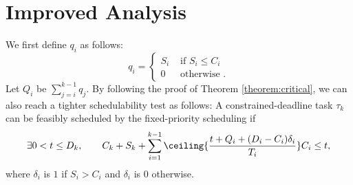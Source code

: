 \section{Improved Analysis}

We first define $q_i$ as follows:
\begin{equation}
  \label{eq:qi}
  q_i =
  \begin{cases}
    S_i & \mbox{ if } S_i \leq C_i\\
    0 & \mbox{ otherwise }.
  \end{cases}
\end{equation}
Let $Q_i$ be $\sum_{j=i}^{k-1} q_j$.  
By following the proof of Theorem \ref{theorem:critical}, we can also reach a tighter schedulability test as follows: A constrained-deadline task $\tau_k$ can be feasibly scheduled by the fixed-priority scheduling if
\begin{equation} \label{eq:TDA-suspension-tighter} 
\exists 0 < t \leq D_k, \qquad C_k+S_k+ \sum_{i=1}^{k-1}\ceiling{\frac{t+Q_i+(D_i-C_i)\delta_i}{T_i}} C_i \leq t,
\end{equation}
where $\delta_i$ is $1$ if $S_i > C_i$ and $\delta_i$ is $0$ otherwise.
  
  
  
  
  
  
  
  
  
  
  
  
  